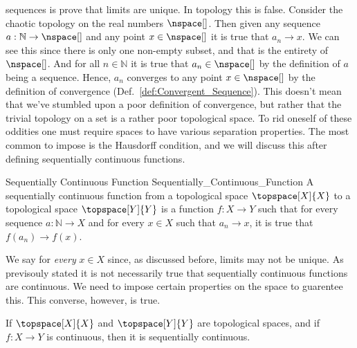         sequences is prove that limits are unique. In topology this is
        false. Consider the chaotic topology on the real numbers
        $\nspace[]$. Then given any sequence
        $a:\mathbb{N}\rightarrow\nspace[]$ and any point $x\in\nspace[]$ it
        is true that $a_{n}\rightarrow{x}$. We can see this since there is
        only one non-empty subset, and that is the entirety of $\nspace[]$.
        And for all $n\in\mathbb{N}$ it is true that $a_{n}\in\nspace[]$ by
        the definition of $a$ being a sequence. Hence, $a_{n}$ converges to
        any point $x\in\nspace[]$ by the definition of convergence
        (Def.~\ref{def:Convergent_Sequence}). This doesn't mean that we've
        stumbled upon a poor definition of convergence, but rather that the
        trivial topology on a set is a rather poor topological space. To rid
        oneself of these oddities one must require spaces to have various
        separation properties. The most common to impose is the Hausdorff
        condition, and we will discuss this after defining sequentially
        continuous functions.
        \begin{fdefinition}{Sequentially Continuous Function}
                           {Sequentially_Continuous_Function}
            A sequentially continuous function from a topological space
            $\topspace[X]{X}$ to a topological space $\topspace[Y]{Y}$ is a
            function $f:X\rightarrow{Y}$ such that for every sequence
            $a:\mathbb{N}\rightarrow{X}$ and for every $x\in{X}$ such that
            $a_{n}\rightarrow{x}$, it is true that
            $f(a_{n})\rightarrow{f}(x)$.
        \end{fdefinition}
        We say for \textit{every} $x\in{X}$ since, as discussed before,
        limits may not be unique. As previsouly stated it is not necessarily
        true that sequentially continuous functions are continuous. We need
        to impose certain properties on the space to guarentee this. This
        converse, however, is true.
        \begin{theorem}
            \label{thm:Cont_is_Seq_Cont}%
            If $\topspace[X]{X}$ and $\topspace[Y]{Y}$ are topological
            spaces, and if $f:X\rightarrow{Y}$ is continuous, then it is
            sequentially continuous.
        \end{theorem}
